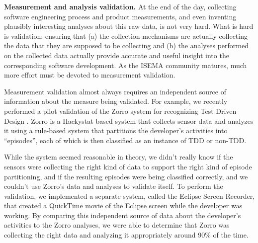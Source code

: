 \documentclass[10pt,twocolumn]{article}
\begin{document}
{\bf Measurement and analysis validation.} At the end of the day,
collecting software engineering process and product measurements, and even
inventing plausibly interesting analyses about this raw data, is not very
hard.  What is hard is validation: ensuring that (a) the collection
mechanisms are actually collecting the data that they are supposed to be
collecting and (b) the analyses performed on the collected data actually
provide accurate and useful insight into the corresponding software
development.  As the ISEMA community matures, much more effort must be
devoted to measurement validation.

Measurement validation almost always requires an independent source of
information about the measure being validated.  For example, we recently
performed a pilot validation of the Zorro system for recognizing Test
Driven Design \cite{csdl2-06-02}.  Zorro is a Hackystat-based system that
collects sensor data and analyzes it using a rule-based system that
partitions the developer's activities into ``episodes'', each of which is
then classified as an instance of TDD or non-TDD.

While the system seemed reasonable in theory, we didn't really know if the
sensors were collecting the right kind of data to support the right kind of
episode partitioning, and if the resulting episodes were being classified
correctly, and we couldn't use Zorro's data and analyses to validate
itself.  To perform the validation, we implemented a separate system,
called the Eclipse Screen Recorder, that created a QuickTime movie of the
Eclipse screen while the developer was working.  By comparing this
independent source of data about the developer's activities to the Zorro
analyses, we were able to determine that Zorro was collecting the right
data and analyzing it appropriately around 90\% of the time.  


 


\end{document}
